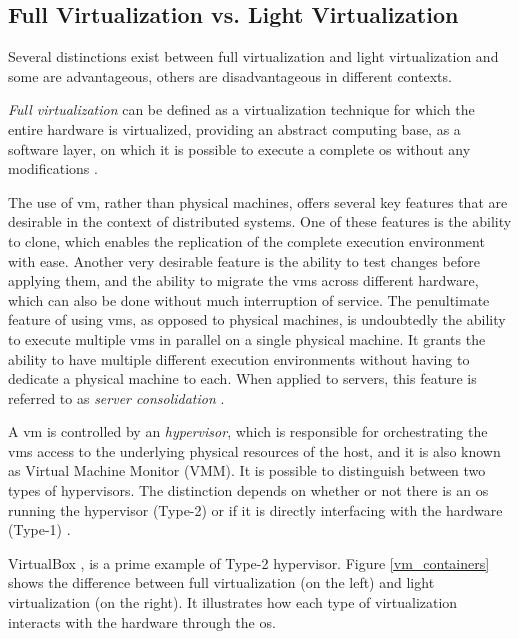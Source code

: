 \documentclass[12pt, titlepage]{uo_temp}
\begin{document}
     \subsection{Full Virtualization vs. Light Virtualization}\label{fvvslv}
     Several distinctions exist between full virtualization and light virtualization and
     some are advantageous, others are disadvantageous in different contexts.

     \emph{Full virtualization} can be defined as a virtualization technique for which the
     entire hardware is virtualized, providing an abstract computing base, as a software
     layer, on which it is possible to execute a complete \gls{os} without any
     modifications \cite{barham2003xen}.

     The use of \gls{vm}, rather than physical machines, offers several key features that
     are desirable in the context of distributed systems. One of these features is the
     ability to clone, which enables the replication of the complete execution environment
     with ease.  Another very desirable feature is the ability to test changes before
     applying them, and the ability to migrate the \gls{vm}s across different hardware,
     which can also be done without much interruption of service. The penultimate feature
     of using \gls{vm}s, as opposed to physical machines, is undoubtedly the ability to
     execute multiple \gls{vm}s in parallel on a single physical machine. It grants the
     ability to have multiple different execution environments without having to dedicate
     a physical machine to each. When applied to servers, this feature is referred to as
     \emph{server consolidation} \cite{tavangarian2012virtual}.

     A \gls{vm} is controlled by an \emph{hypervisor}, which is responsible for
     orchestrating the \gls{vm}s access to the underlying physical resources of the host,
     and it is also known as Virtual Machine Monitor (VMM). It is possible to distinguish
     between two types of hypervisors. The distinction depends on whether or not there is
     an \gls{os} running the hypervisor (Type-2) or if it is directly interfacing with the
     hardware (Type-1) \cite{popek1974formal}.

     VirtualBox \cite{watson2008virtualbox}, is a prime example of Type-2 hypervisor.
     Figure \ref{vm_containers} shows the difference between full virtualization (on the
     left) and light virtualization (on the right). It illustrates how each type of
     virtualization interacts with the hardware through the \gls{os}.
\end{document}
